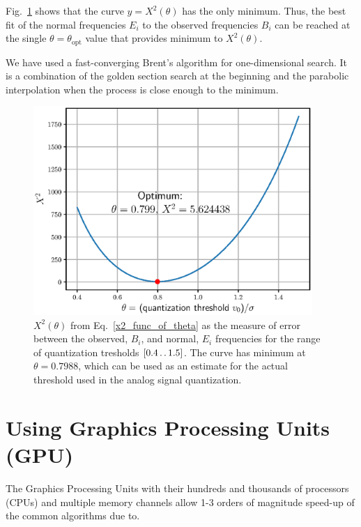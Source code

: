 \documentclass[letterpaper,twoside,12pt]{article}
\begin{document}
Fig.~\ref{optimum_theta} shows that the curve $y = X^2(\theta)$ has the only minimum. Thus, the best fit of the normal frequencies $E_i$ to the observed frequencies $B_i$ can be reached at the single $\theta=\theta_\text{opt}$ value that provides minimum to $X^2(\theta)$. 

We have used a fast-converging Brent's algorithm for one-dimensional search. It is a combination of the golden section search at the beginning and the parabolic interpolation when the process is close enough to the minimum.


\begin{figure}[ht!]
  \begin{center}
  \includegraphics[width=25pc]{fig_optimal_quantization_threshold.eps}
  \caption{\small $X^2(\theta)$ from Eq.~\eqref{x2_func_of_theta} as the measure of error between the observed, $B_i$, and normal, $E_i$ frequencies for the range of quantization tresholds $[0.4 \mathinner{\ldotp\ldotp}1.5]$. The curve has minimum at $\theta = 0.7988$, which can be used as an estimate for the actual threshold used in the analog signal quantization.}
  \label{optimum_theta}
  \end{center}
\end{figure}


\section{Using Graphics Processing Units (GPU)}

The Graphics Processing Units with their hundreds and thousands of processors (CPUs) and multiple memory channels allow 1-3 orders of magnitude speed-up of the common algorithms due to.
\end{document}
